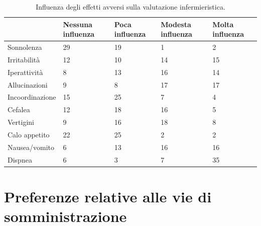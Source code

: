 \newpage

\bgroup
\def\arraystretch{1.5}
\begin{table}[!h]
    \centering
    \begin{tabular}{p{} p{} p{} p{} p{}}
  & \footnotesize{Nessuna influenza} & \footnotesize{Poca influenza} & \footnotesize{Modesta influenza} & \footnotesize{Molta influenza}\\ \hline
    \footnotesize{Sonnolenza} & \footnotesize29 & \footnotesize19 & \footnotesize1 & \footnotesize2\\ \hline
    \footnotesize{Irritabilità} & \footnotesize12 & \footnotesize10 & \footnotesize14 & \footnotesize15\\ \hline
    \footnotesize{Iperattività} & \footnotesize8 & \footnotesize13 & \footnotesize16 & \footnotesize14\\ \hline
    \footnotesize{Allucinazioni} & \footnotesize9 & \footnotesize8 & \footnotesize17 & \footnotesize17\\ \hline
    \footnotesize{Incoordinazione} & \footnotesize15 & \footnotesize25 & \footnotesize7 & \footnotesize4\\ \hline
    \footnotesize{Cefalea} & \footnotesize12 & \footnotesize18 & \footnotesize16 & \footnotesize5\\ \hline
    \footnotesize{Vertigini}  & \footnotesize9 & \footnotesize16 & \footnotesize18 & \footnotesize8\\ \hline
    \footnotesize{Calo appetito} & \footnotesize22 & \footnotesize25 & \footnotesize2 & \footnotesize2\\ \hline
    \footnotesize{Nausea/vomito} & \footnotesize6 & \footnotesize13 & \footnotesize16 & \footnotesize16\\ \hline
    \footnotesize{Dispnea} & \footnotesize6 & \footnotesize3 & \footnotesize7 & \footnotesize35\\ \hline

    \end{tabular}
    \caption{Influenza degli effetti avversi sulla valutazione infermieristica.}
    \label{tab:effavv2}
\end{table}
\egroup



\section{Preferenze relative alle vie di somministrazione}

